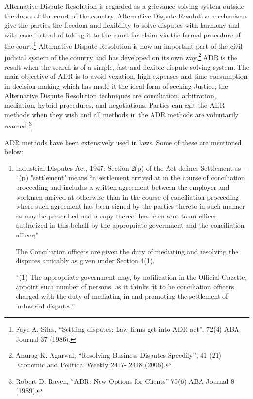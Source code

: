\begin{multicols}{2}
\noi
Alternative Dispute Resolution is regarded as a grievance solving system outside the doors of
the court of the country. Alternative Dispute Resolution mechanisms give the parties the
freedom and flexibility to solve disputes with harmony and with ease instead of taking it to the court for claim via the formal procedure of the court.\footnote{Faye A. Silas, “Settling disputes: Law firms get into ADR act”, 72(4) ABA Journal 37 (1986).} Alternative Dispute Resolution is now
an important part of the civil judicial system of the country and has developed on its own
way.\footnote{Anurag K. Agarwal, “Resolving Business Disputes Speedily”, 41 (21) Economic and Political Weekly 2417- 2418 (2006).} ADR is the result when the search is of a simple, fast and flexible dispute solving system.
The main objective of ADR is to avoid vexation, high expenses and time consumption in
decision making which has made it the ideal form of seeking Justice, the Alternative Dispute
Resolution techniques are conciliation, arbitration, mediation, hybrid procedures, and
negotiations. Parties can exit the ADR methods when they wish and all methods in the ADR
methods are voluntarily reached.\footnote{Robert D. Raven, “ADR: New Options for Clients” 75(6) ABA Journal 8 (1989).}


\noi
ADR methods have been extensively used in laws. Some of these are mentioned below:

\vspace{-.2cm}

\begin{enumerate}
\itemsep=0pt
\item Industrial Disputes Act, 1947: Section 2(p) of the Act defines Settlement as – “(p)
"settlement" means “a settlement arrived at in the course of conciliation proceeding and
includes a written agreement between the employer and workmen arrived at otherwise than in
the course of conciliation proceeding where such agreement has been signed by the parties
thereto in such manner as may be prescribed and a copy thereof has been sent to an officer
authorized in this behalf by the appropriate government and the conciliation officer;”

\noi
The Conciliation officers are given the duty of mediating and resolving the disputes amicably
as given under Section 4(1).

\noi
“(1) The appropriate government may, by notification in the Official Gazette, appoint such
number of persons, as it thinks fit to be conciliation officers, charged with the duty of mediating
in and promoting the settlement of industrial disputes.”


\end{enumerate}
\end{multicols}
